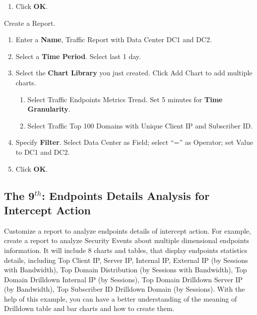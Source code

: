 \begin{description}
\begin{enumerate}
\begin{enumerate}
            \item 	Click \textbf{OK}.
        \end{enumerate}
    \end{enumerate}
    \item[STEP 3.]	Create a Report. 
    \begin{enumerate}
        \item Enter a \textbf{Name}, Traffic Report with Data Center DC1 and DC2. 
        \item Select a \textbf{Time Period}. Select last 1 day.
        \item Select the \textbf{Chart Library} you just created. Click Add Chart to add multiple charts.
        \begin{enumerate}
            \item	Select Traffic Endpoints Metrics Trend. Set 5 minutes for \textbf{Time Granularity}.
            \item	Select Traffic Top 100 Domains with Unique Client IP and Subscriber ID.
        \end{enumerate}
        \item Specify \textbf{Filter}. Select Data Center as Field; select “=” as Operator; set Value to DC1 and DC2. 
        \item Click \textbf{OK}.
    \end{enumerate}
\end{description}

\subsection*{\hypertarget{link:The 9th: Endpoints Details Analysis for Intercept Action }{The 9$^{th}$: Endpoints Details Analysis for Intercept Action }}
\label{sec:appendix_f:report:9th}

Customize a report to analyze endpoints details of intercept action. For example, create a report to analyze Security Events about multiple dimensional endpoints information. It will include 8 charts and tables, that display endpoints statistics details, including Top Client IP, Server IP, Internal IP, External IP (by Sessions with Bandwidth), Top Domain Distribution (by Sessions with Bandwidth), Top Domain Drilldown Internal IP (by Sessions), Top Domain Drilldown Server IP (by Bandwidth), Top Subscriber ID Drilldown Domain (by Sessions). With the help of this example, you can have a better understanding of the meaning of Drilldown table and bar charts and how to create them.


